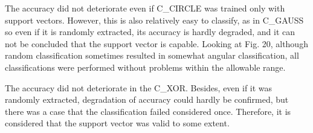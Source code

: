 The accuracy did not deteriorate even if C\_CIRCLE was trained only with support vectors. However, this is also relatively easy to classify, as in C\_GAUSS so even if it is randomly extracted, its accuracy is hardly degraded, and it can not be concluded that the support vector is capable. Looking at Fig. 20, although random classification sometimes resulted in somewhat angular classification, all classifications were performed without problems within the allowable range.

The accuracy did not deteriorate in the C\_XOR. Besides, even if it was randomly extracted, degradation of accuracy could hardly be confirmed, but there was a case that the classification failed considered once. Therefore, it is considered that the support vector was valid to some extent.

\begin{figure}[t]
\begin{center}

\end{center}
\end{figure}
